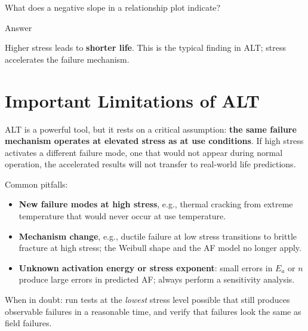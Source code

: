 \documentclass[
  letterpaper,
  DIV=11,
  numbers=noendperiod]{scrreprt}
\providecommand{\tightlist}{%
  \setlength{\itemsep}{0pt}\setlength{\parskip}{0pt}}
\begin{document}
\begin{tcolorbox}[enhanced jigsaw, arc=.35mm, bottomrule=.15mm, bottomtitle=1mm, breakable, colback=white, colbacktitle=quarto-callout-tip-color!10!white, colframe=quarto-callout-tip-color-frame, coltitle=black, left=2mm, leftrule=.75mm, opacityback=0, opacitybacktitle=0.6, rightrule=.15mm, title=\textcolor{quarto-callout-tip-color}{\faLightbulb}\hspace{0.5em}{Review}, titlerule=0mm, toprule=.15mm, toptitle=1mm]

What does a negative slope in a relationship plot indicate?

Answer

Higher stress leads to \textbf{shorter life}. This is the typical
finding in ALT; stress accelerates the failure mechanism.

\end{tcolorbox}

\section{Important Limitations of
ALT}\label{important-limitations-of-alt}

\begin{tcolorbox}[enhanced jigsaw, arc=.35mm, bottomrule=.15mm, bottomtitle=1mm, breakable, colback=white, colbacktitle=quarto-callout-important-color!10!white, colframe=quarto-callout-important-color-frame, coltitle=black, left=2mm, leftrule=.75mm, opacityback=0, opacitybacktitle=0.6, rightrule=.15mm, title=\textcolor{quarto-callout-important-color}{\faExclamation}\hspace{0.5em}{When ALT Predictions May Be Invalid}, titlerule=0mm, toprule=.15mm, toptitle=1mm]

ALT is a powerful tool, but it rests on a critical assumption:
\textbf{the same failure mechanism operates at elevated stress as at use
conditions}. If high stress activates a different failure mode, one that
would not appear during normal operation, the accelerated results will
not transfer to real-world life predictions.

Common pitfalls:

\begin{itemize}
\tightlist
\item
  \textbf{New failure modes at high stress}, e.g., thermal cracking from
  extreme temperature that would never occur at use temperature.
\item
  \textbf{Mechanism change}, e.g., ductile failure at low stress
  transitions to brittle fracture at high stress; the Weibull shape and
  the AF model no longer apply.
\item
  \textbf{Unknown activation energy or stress exponent}: small errors in
  \(E_a\) or \(n\) produce large errors in predicted AF; always perform
  a sensitivity analysis.
\end{itemize}

When in doubt: run tests at the \emph{lowest} stress level possible that
still produces observable failures in a reasonable time, and verify that
failures look the same as field failures.

\end{tcolorbox}
\end{document}
